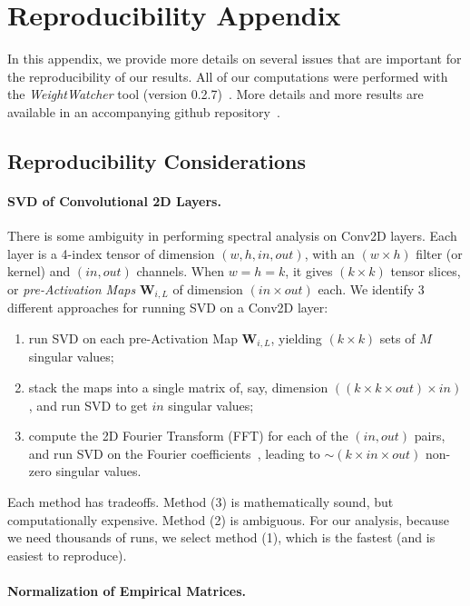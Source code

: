 \section{Reproducibility Appendix}
\label{sxn:appendix}


In this appendix, we provide more details on several issues that are important for the reproducibility of our results.
%
All of our computations were performed with the \emph{WeightWatcher} tool (version 0.2.7)~\cite{weightwatcher_package}.
More details and more results are available in an accompanying github repository~\cite{kdd20_sub_repo}.


\subsection{Reproducibility Considerations}


\paragraph{SVD of Convolutional 2D Layers.}

There is some ambiguity in performing spectral analysis on Conv2D layers.  
Each layer is a 4-index tensor of dimension $(w,h,in,out)$, with an $(w\times h)$ filter (or kernel) and $(in, out)$
channels. When $w=h=k$, it gives $(k\times k)$ tensor slices, or \emph{pre-Activation Maps} $\mathbf{W}_{i,L}$ of dimension $(in\times out)$ each. 
%
We identify 3 different approaches for running SVD on a Conv2D layer:
\begin{enumerate}
\item run SVD on each pre-Activation Map $\mathbf{W}_{i,L}$, yielding $(k\times k)$ sets of $M$ singular values;
\item stack the maps into a single matrix of, say, dimension $((k\times k\times out)\times in)$, and run SVD to get $in$ singular values;
\item compute the 2D Fourier Transform (FFT) for each of the $(in, out)$ pairs, and run SVD on the Fourier coefficients~\cite{CNNSVD}, leading to $\sim(k\times in\times out)$ non-zero singular values.
\end{enumerate}
Each method has tradeoffs.  
Method (3) is mathematically sound, but computationally expensive. Method (2) is ambiguous.
For our analysis, because we need thousands of runs, we select method (1), which is the fastest (and is easiest to reproduce).


\paragraph{Normalization of Empirical Matrices.}  


